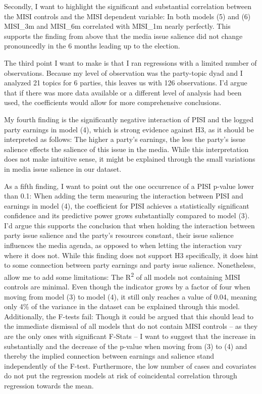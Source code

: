 \documentclass[11pt,a4paper]{article}
\begin{document}
Secondly, I want to highlight the significant and substantial correlation between the MISI controls and the MISI dependent variable: In both models (5) and (6) MISI\_3m and MISI\_6m correlated with MISI\_1m nearly perfectly. This supports the finding from above that the media issue salience did not change pronouncedly in the 6 months leading up to the election.

The third point I want to make is that I ran regressions with a limited number of observations. Because my level of observation was the party-topic dyad and I analyzed 21 topics for 6 parties, this leaves us with 126 observations. I’d argue that if there was more data available or a different level of analysis had been used, the coefficients would allow for more comprehensive conclusions.

My fourth finding is the significantly negative interaction of PISI and the logged party earnings in model (4), which is strong evidence against H3, as it should be interpreted as follows: The higher a party's earnings, the less the party's issue salience effects the salience of this issue in the media. While this interpretation does not make intuitive sense, it might be explained through the small variations in media issue salience in our dataset.

As a fifth finding, I want to point out the one occurrence of a PISI p-value lower than 0.1: When adding the term measuring the interaction between PISI and earnings in model (4), the coefficient for PISI achieves a statistically significant confidence and its predictive power grows substantially compared to model (3). I’d argue this supports the conclusion that when holding the interaction between party issue salience and the party’s resources constant, their issue salience influences the media agenda, as opposed to when letting the interaction vary where it does not. While this finding does not support H3 specifically, it does hint to some connection between party earnings and party issue salience. Nonetheless, allow me to add some limitations: The R\textsuperscript{2} of all models not containing MISI controls are minimal. Even though the indicator grows by a factor of four when moving from model (3) to model (4), it still only reaches a value of 0.04, meaning only 4\% of the variance in the dataset can be explained through this model. Additionally, the F-tests fail: Though it could be argued that this should lead to the immediate dismissal of all models that do not contain MISI controls – as they are the only ones with significant F-Stats – I want to suggest that the increase in substantially and the decrease of the p-value when moving from (3) to (4) and thereby the implied connection between earnings and salience stand independently of the F-test. Furthermore, the low number of cases and covariates do not put the regression models at risk of coincidental correlation through regression towards the mean.
\end{document}
